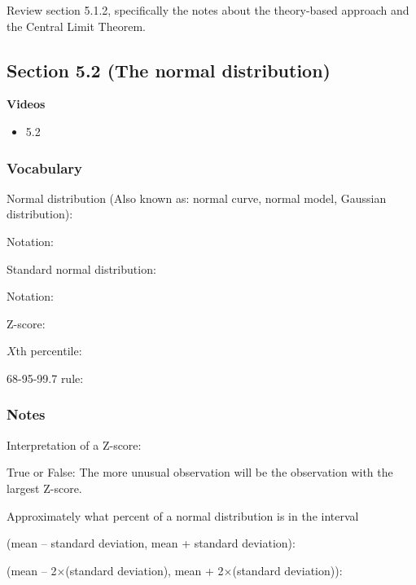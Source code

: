 \documentclass[
]{report}
\providecommand{\tightlist}{%
  \setlength{\itemsep}{0pt}\setlength{\parskip}{0pt}}
\newcommand{\rgs}{\vspace{12pt}} %
\newcommand{\rgi}{\hspace{24pt}}  %
\begin{document}
Review section 5.1.2, specifically the notes about the theory-based approach and the Central Limit Theorem.

\hypertarget{section-5.2-the-normal-distribution}{%
\subsection*{Section 5.2 (The normal distribution)}\label{section-5.2-the-normal-distribution}}


\textbf{Videos}

\begin{itemize}
\tightlist
\item
  5.2
\end{itemize}


\hypertarget{vocabulary-12}{%
\subsubsection*{Vocabulary}\label{vocabulary-12}}

Normal distribution (Also known as: normal curve, normal model, Gaussian distribution):
\rgs

\rgi Notation:
\rgs

Standard normal distribution:
\rgs

\rgi Notation:
\rgs

Z-score:
\rgs

\(X\)th percentile:
\rgs

68-95-99.7 rule:
\rgs

\hypertarget{notes-17}{%
\subsubsection*{Notes}\label{notes-17}}

Interpretation of a Z-score:
\rgs

True or False: The more unusual observation will be the observation with the largest Z-score.

Approximately what percent of a normal distribution is in the interval

\rgi (mean -- standard deviation, mean + standard deviation):
\rgs

\rgi (mean -- 2\(\times\)(standard deviation), mean + 2\(\times\)(standard deviation)):
\rgs
\end{document}
